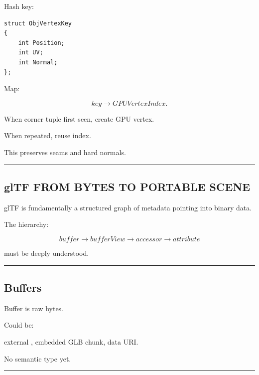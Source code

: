 Hash key:

\begin{verbatim}
struct ObjVertexKey
{
    int Position;
    int UV;
    int Normal;
};
\end{verbatim}

Map:

\[
key\rightarrow GPUVertexIndex.
\]

When corner tuple first seen, create GPU vertex.

When repeated, reuse index.

This preserves seams and hard normals.

\begin{center}\rule{0.5\linewidth}{0.5pt}\end{center}

\subsection{glTF FROM BYTES TO PORTABLE SCENE}\label{04-visual-computing-ii-ch041-gltf-from-bytes-to-portable-scene}

\hypertarget{04-visual-computing-ii-ch041-gltf-from-bytes-to-portable-scene}{}

glTF is fundamentally a structured graph of metadata pointing into binary data.

The hierarchy:

\[
\boxed{
buffer
\rightarrow
bufferView
\rightarrow
accessor
\rightarrow
attribute
}
\]

must be deeply understood.

\begin{center}\rule{0.5\linewidth}{0.5pt}\end{center}

\subsection{Buffers}\label{04-visual-computing-ii-ch041-buffers}

\hypertarget{04-visual-computing-ii-ch041-buffers}{}

Buffer is raw bytes.

Could be:

external , embedded GLB chunk, data URI.

No semantic type yet.

\begin{center}\rule{0.5\linewidth}{0.5pt}\end{center}

